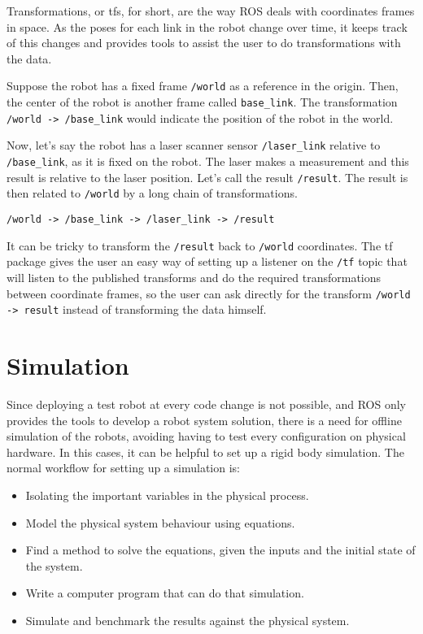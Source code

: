 Transformations, or tfs, for short, are the way ROS deals with coordinates frames in space. As the poses for each link in the robot change over time, it keeps track of this changes and provides tools to assist the user to do transformations with the data.

Suppose the robot has a fixed frame \texttt{/world} as a reference in the origin. Then, the center of the robot is another frame called \texttt{base\_link}. The transformation \texttt{/world -> /base\_link} would indicate the position of the robot in the world.

Now, let's say the robot has a laser scanner sensor \texttt{/laser\_link} relative to \texttt{/base\_link}, as it is fixed on the robot. The laser makes a measurement and this result is relative to the laser position. Let's call the result \texttt{/result}. The result is then related to \texttt{/world} by a long chain of transformations.

\begin{verbatim}
/world -> /base_link -> /laser_link -> /result
\end{verbatim}

It can be tricky to transform the \texttt{/result} back to \texttt{/world} coordinates. The tf package gives the user an easy way of setting up a listener on the \texttt{/tf} topic that will listen to the published transforms and do the required transformations between coordinate frames, so the user can ask directly for the transform \texttt{/world -> result} instead of transforming the data himself.

\section{Simulation}

Since deploying a test robot at every code change is not possible, and ROS only provides the tools to develop a robot system solution, there is a need for offline simulation of the robots, avoiding having to test every configuration on physical hardware. In this cases, it can be helpful to set up a rigid body simulation. The normal workflow for setting up a simulation is:

\begin{itemize}
    \item Isolating the important variables in the physical process.
    \item Model the physical system behaviour using equations.
    \item Find a method to solve the equations, given the inputs and the initial state of the system.
    \item Write a computer program that can do that simulation.
    \item Simulate and benchmark the results against the physical system.
\end{itemize}


